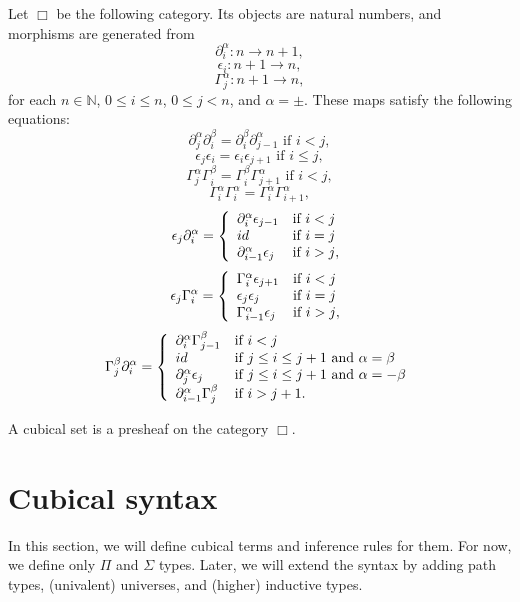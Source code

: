 \documentclass{amsart}
\theoremstyle{definition}
\theoremstyle{remark}
\newcommand{\nats}{\mathbb{N}}
\numberwithin{table}{section}
\begin{document}
Let $\Box$ be the following category. Its objects are natural numbers, and morphisms are generated from
\[ \partial^\alpha_i : n \to n + 1, \]
\[ \epsilon_i : n + 1 \to n, \]
\[ \Gamma^\alpha_j : n + 1 \to n, \]
for each $n \in \nats$, $0 \leq i \leq n$, $0 \leq j < n$, and $\alpha = \pm$.
These maps satisfy the following equations:
\[ \partial^\alpha_j \partial^\beta_i = \partial^\beta_i \partial^\alpha_{j-1} \text{ if $i < j$}, \]
\[ \epsilon_j \epsilon_i = \epsilon_i \epsilon_{j+1} \text{ if $i \leq j$}, \]
\[ \Gamma^\alpha_j \Gamma^\beta_i = \Gamma^\beta_i \Gamma^\alpha_{j+1} \text{ if $i < j$}, \]
\[ \Gamma^\alpha_i \Gamma^\alpha_i = \Gamma^\alpha_i \Gamma^\alpha_{i+1}, \]
\[ \epsilon_j \partial^\alpha_i = \left\{ \begin{array}{l l}
            \partial^\alpha_i \epsilon_{j-1} & \text{if $i < j$} \\
            id                               & \text{if $i = j$} \\
            \partial^\alpha_{i-1} \epsilon_j & \text{if $i > j$},
    \end{array} \right. \]
\[ \epsilon_j \Gamma^\alpha_i = \left\{ \begin{array}{l l}
            \Gamma^\alpha_i \epsilon_{j+1} & \text{if $i < j$} \\
            \epsilon_j \epsilon_j         & \text{if $i = j$} \\
            \Gamma^\alpha_{i-1} \epsilon_j & \text{if $i > j$},
    \end{array} \right. \]
\[ \Gamma^\beta_j \partial^\alpha_i = \left\{ \begin{array}{l l}
            \partial^\alpha_i \Gamma^\beta_{j-1} & \text{if $i < j$} \\
            id                                   & \text{if $j \leq i \leq j + 1$ and $\alpha = \beta$} \\
            \partial^\alpha_j \epsilon_j         & \text{if $j \leq i \leq j + 1$ and $\alpha = -\beta$} \\
            \partial^\alpha_{i-1} \Gamma^\beta_j & \text{if $i > j + 1$}.
    \end{array} \right. \]

A cubical set is a presheaf on the category $\Box$.

\section{Cubical syntax}

In this section, we will define cubical terms and inference rules for them.
For now, we define only $\Pi$ and $\Sigma$ types.
Later, we will extend the syntax by adding path types, (univalent) universes, and (higher) inductive types.
\end{document}
